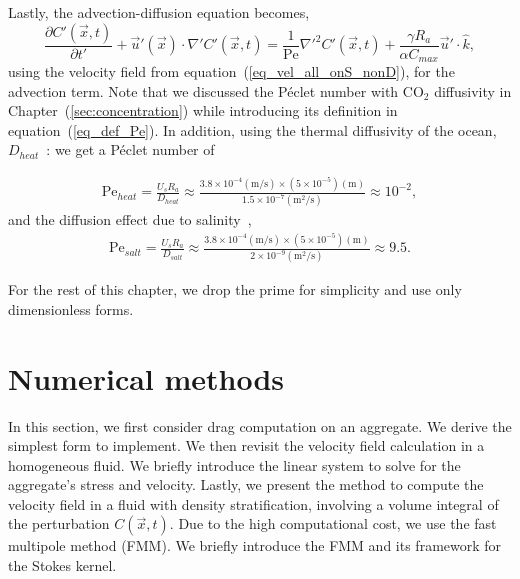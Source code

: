 \par
Lastly, the advection-diffusion equation becomes, 
	\begin{equation}
	\frac{\partial C'(\vec{x},t)}{\partial t'}
	+ \vec{u}'(\vec{x}) \cdot \nabla' C'(\vec{x},t)
	 = \frac{1}{\textrm{Pe}} {\nabla'}^2 C'(\vec{x},t)
	 +\frac{\gamma R_a}{ \alpha C_{max}} \vec{u}' \cdot \hat{k},
	\label{eq_AD_nonD}
	\end{equation}
using the velocity field from equation~(\ref{eq_vel_all_onS_nonD}), for the advection term.
Note that we discussed the Péclet number with CO$_2$ diffusivity in Chapter~(\ref{sec:concentration}) while introducing its definition in equation~(\ref{eq_def_Pe}).
In addition, using the thermal diffusivity of the ocean, $D_{heat}$~\cite{nayar_thermophysical_2016,sharqawy_thermophysical_2010}: we get a Péclet number of

\begin{align}
	\text{Pe}_{heat} 
	= \frac{U_s R_a }{D_{heat}} 
	\approx \frac{3.8 \times 10^{-4}(\text{m/s}) \times \left(5 \times 10^{-5} \right) (\text{m})}{1.5 \times 10^{-7} (\text{m}^2\text{/s})} \approx 10^{-2},
\end{align} 
and the diffusion effect due to salinity~\cite{wollast_diffusion_1971}, 
\begin{align}
	\text{Pe}_{salt}
	= \frac{U_s R_a }{D_{salt}} 
	\approx \frac{3.8 \times 10^{-4}(\text{m/s}) \times \left(5 \times 10^{-5} \right) (\text{m})}{ 2\times 10^{-9} (\text{m}^2\text{/s})} \approx 9.5.
\end{align}
\par
For the rest of this chapter, we drop the prime for simplicity and use only dimensionless forms. 


\section{Numerical methods}
In this section, we first consider drag computation on an aggregate. We derive the simplest form to implement. We then revisit the velocity field calculation in a homogeneous fluid. We briefly introduce the linear system to solve for the aggregate's stress and velocity. Lastly, we present the method to compute the velocity field in a fluid with density stratification, involving a volume integral of the perturbation $C(\vec{x},t)$. Due to the high computational cost, we use the fast multipole method (FMM). We briefly introduce the FMM and its framework for the Stokes kernel.

